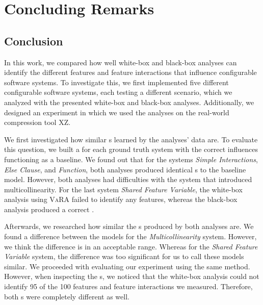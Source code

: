 \chapter{Concluding Remarks}\label{ch:conclusion}

\section{Conclusion}\label{sec:conclusion}
In this work, we compared how well white-box and black-box analyses can identify the different features and feature interactions 
that influence configurable software systems. To investigate this, we first implemented five different configurable software systems,
each testing a different scenario, which we analyzed with the presented white-box and black-box analyses. Additionally, 
we designed an experiment in which we used the analyses on the real-world compression tool \textsc{XZ}.

We first investigated how similar {\perfInfluenceModel}s learned by the analyses' data are. 
To evaluate this question, we built a {\perfInfluenceModel} for each ground truth system with the correct influences functioning as a baseline. 
We found out that for the systems \emph{Simple Interactions}, \emph{Else Clause}, and \emph{Function}, 
both analyses produced identical {\perfInfluenceModel}s to the baseline model. 
However, both analyses had difficulties with the system that introduced multicollinearity. 
For the last system \emph{Shared Feature Variable}, the white-box analysis using \textsc{VaRA} failed to identify any features, 
whereas the black-box analysis produced a correct {\perfInfluenceModel}.

Afterwards, we researched how similar the {\perfInfluenceModel}s produced by both analyses are. 
We found a difference between the models for the \emph{Multicollinearity} system. 
However, we think the difference is in an acceptable range. Whereas for the \emph{Shared Feature Variable} system, 
the difference was too significant for us to call these models similar. We proceeded with evaluating our experiment using the same method. 
However, when inspecting the {\perfInfluenceModel}s, we noticed that the white-box analysis could not identify 95 of the 100 features and 
feature interactions we measured. Therefore, both {\perfInfluenceModel}s were completely different as well.

